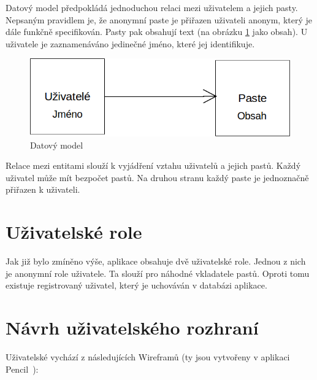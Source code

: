 \documentclass[a4paper,10pt]{report}
\begin{document}
Datový model předpokládá jednoduchou relaci mezi uživatelem a jejich pasty. Nepsaným pravidlem je, že anonymní paste je přiřazen uživateli anonym, který je dále funkčně specifikován. Pasty pak obsahují text (na obrázku \ref{dat_mod} jako obsah). U uživatele je zaznamenáváno jedinečné jméno, které jej identifikuje. 

\begin{figure}[H]
  \centering
	\includegraphics[scale=0.4]{dat_mod.png} 
  \caption{Datový model}
  \label{dat_mod}
\end{figure}

Relace mezi entitami slouží k vyjádření vztahu uživatelů a jejich pastů. Každý uživatel může mít bezpočet pastů. Na druhou stranu každý paste je jednoznačně přiřazen k uživateli.

\section{Uživatelské role}

Jak již bylo zmíněno výše, aplikace obsahuje dvě uživatelské role. Jednou z nich je anonymní role uživatele. Ta slouží pro náhodné vkladatele pastů. Oproti tomu existuje registrovaný uživatel, který je uchováván v databázi aplikace. 

\section{Návrh uživatelského rozhraní}

Uživatelské vychází z následujících Wireframů (ty jsou vytvořeny v aplikaci Pencil~\cite{pencil}):
\end{document}
